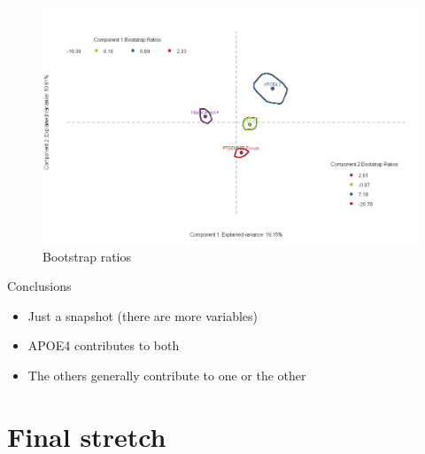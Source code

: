 \documentclass[
  ignorenonframetext,
]{beamer}
\providecommand{\tightlist}{%
  \setlength{\itemsep}{0pt}\setlength{\parskip}{0pt}}
\begin{document}
\begin{frame}

\begin{figure}
\centering
\includegraphics{../Images/boot6.png}
\caption{Bootstrap ratios}
\end{figure}

\end{frame}

\begin{frame}{Conclusions}
\protect\hypertarget{conclusions-2}{}

\begin{itemize}[<+->]
\tightlist
\item
  Just a snapshot (there are more variables)
\item
  APOE4 contributes to both
\item
  The others generally contribute to one or the other
\end{itemize}

\end{frame}

\hypertarget{final-stretch}{%
\section{Final stretch}\label{final-stretch}}
\end{document}
